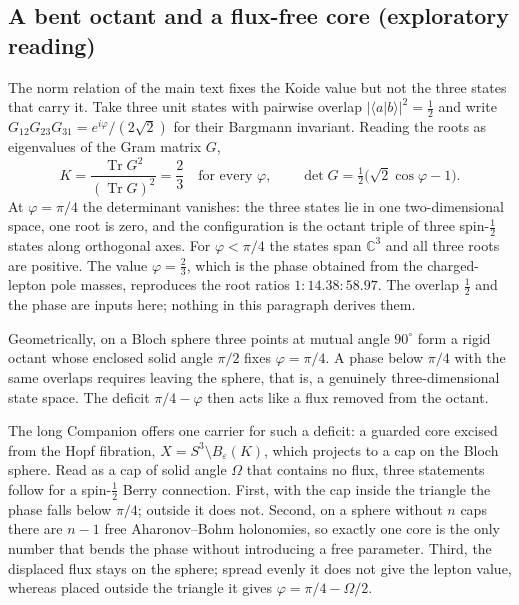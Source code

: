 \subsection{A bent octant and a flux-free core (exploratory reading)}

The norm relation of the main text fixes the Koide value but not the
three states that carry it. Take three unit states with pairwise
overlap $|\langle a|b\rangle|^2=\tfrac12$ and write
$G_{12}G_{23}G_{31}=e^{i\varphi}/(2\sqrt2)$ for their Bargmann
invariant. Reading the roots as eigenvalues of the Gram matrix $G$,
\begin{equation}
 K=\frac{\operatorname{Tr}G^2}{(\operatorname{Tr}G)^2}=\frac23
 \quad\text{for every }\varphi,\qquad
 \det G=\tfrac12\bigl(\sqrt2\cos\varphi-1\bigr).
\end{equation}
At $\varphi=\pi/4$ the determinant vanishes: the three states lie in
one two-dimensional space, one root is zero, and the configuration is
the octant triple of three spin-$\tfrac12$ states along orthogonal
axes. For $\varphi<\pi/4$ the states span $\mathbb C^3$ and all three
roots are positive. The value $\varphi=\tfrac23$, which is the phase
obtained from the charged-lepton pole masses, reproduces the root
ratios $1:14.38:58.97$. The overlap $\tfrac12$ and the phase are inputs
here; nothing in this paragraph derives them.

Geometrically, on a Bloch sphere three points at mutual angle $90^\circ$
form a rigid octant whose enclosed solid angle $\pi/2$ fixes
$\varphi=\pi/4$. A phase below $\pi/4$ with the same overlaps requires
leaving the sphere, that is, a genuinely three-dimensional state
space. The deficit $\pi/4-\varphi$ then acts like a flux removed from
the octant.

The long Companion offers one carrier for such a deficit: a guarded
core excised from the Hopf fibration, $X=S^3\setminus B_\varepsilon(K)$,
which projects to a cap on the Bloch sphere. Read as a cap of solid
angle $\Omega$ that contains no flux, three statements follow for a
spin-$\tfrac12$ Berry connection. First, with the cap inside the
triangle the phase falls below $\pi/4$; outside it does not. Second,
on a sphere without $n$ caps there are $n-1$ free Aharonov--Bohm
holonomies, so exactly one core is the only number that bends the
phase without introducing a free parameter. Third, the displaced flux
stays on the sphere; spread evenly it does not give the lepton value,
whereas placed outside the triangle it gives
$\varphi=\pi/4-\Omega/2$.

